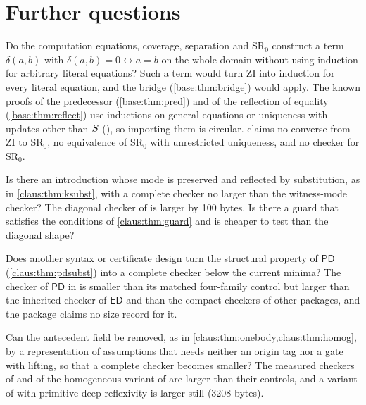\section{Further questions}
\label{claus:sec:questions}

\begin{question}
\label{claus:q:rigidity}
Do the computation equations, coverage, separation and $\mathrm{SR}_0$
construct a term $\delta(a,b)$ with $\delta(a,b)=0\leftrightarrow a=b$ on
the whole domain without using induction for arbitrary literal equations?
Such a term would turn $\mathrm{ZI}$ into induction for every literal
equation, and the bridge (\cref{base:thm:bridge}) would apply. The known
proofs of the predecessor (\cref{base:thm:pred}) and of the reflection of
equality (\cref{base:thm:reflect}) use inductions on general equations or
uniqueness with updates other than $S$
(), so importing them is
circular.
 claims no converse from $\mathrm{ZI}$ to
$\mathrm{SR}_0$, no equivalence of $\mathrm{SR}_0$ with unrestricted
uniqueness, and no checker for $\mathrm{SR}_0$.
\end{question}

\begin{question}
Is there an introduction whose mode is preserved and reflected by
substitution, as in \cref{claus:thm:ksubst}, with a complete checker no
larger than the witness-mode checker? The diagonal checker of
 is larger by 100 bytes. Is there a guard that
satisfies the conditions of \cref{claus:thm:guard} and is cheaper to test
than the diagonal shape?
\end{question}

\begin{question}
Does another syntax or certificate design turn the structural property of
$\mathsf{PD}$ (\cref{claus:thm:pdsubst}) into a complete checker below the
current minima? The checker of $\mathsf{PD}$ in
 is smaller than its matched four-family
control but larger than the inherited checker of $\mathsf{ED}$ and than the
compact checkers of other packages, and the package claims no size record
for it.
\end{question}

\begin{question}
Can the antecedent field be removed, as in
\cref{claus:thm:onebody,claus:thm:homog}, by a representation of
assumptions that needs neither an origin tag nor a gate with lifting, so
that a complete checker becomes smaller? The measured checkers of
 and of the homogeneous variant of 
are larger than their controls, and a variant of  with
primitive deep reflexivity is larger still (3208 bytes).
\end{question}

